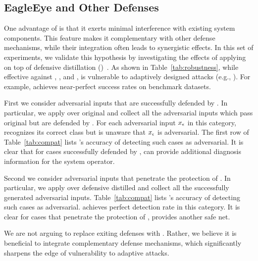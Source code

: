 \subsection{EagleEye and Other Defenses}
\label{sec:sec3}

One advantage of \system is that it exerts minimal interference with existing system components. This feature makes it complementary with other defense mechanisms, while their integration often leads to synergistic effects. In this set of experiments, we validate this hypothesis by investigating the effects of applying \system on top of defensive distillation (\dd)~\cite{Papernot:2016:sp}.
As shown in Table~\ref{tab:robustness}, while effective against \ttg, \tth, and \ttpa, \dd is vulnerable to adaptively designed attacks (e.g., \ttca). For example, \ttca achieves near-perfect success rates on benchmark datasets.

First we consider adversarial inputs that are successfully defended by \dd. In particular, we apply \ttpa over original \dnns and collect all the adversarial inputs which pass original \dnns but are defended by \dd. For each adversarial input $x_{\epsilon}$ in this category, \dd recognizes its correct class but is unaware that $x_{\epsilon}$ is adversarial.
The first row of Table~\ref{tab:compat} lists \system's accuracy of detecting such cases as adversarial. It is clear that for cases successfully defended by \dd, \system can provide additional diagnosis information for the system operator.

Second we consider adversarial inputs that penetrate the protection of \dd. In particular, we apply \ttca over defensive distilled \dnns and collect all the successfully generated adversarial inputs. Table~\ref{tab:compat} lists \system's accuracy of detecting such cases as adversarial. \system achieves perfect detection rate in this category. It is clear for cases that penetrate the protection of \dd, \system provides another safe net.

%

We are not arguing to replace exiting defenses with \system. Rather, we believe it is beneficial to integrate complementary defense mechanisms, which significantly sharpens the edge of vulnerability to adaptive attacks.
